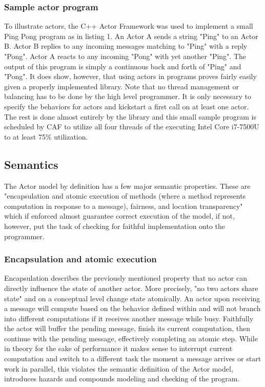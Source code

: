 \documentclass[A4]{article}
\begin{document}
\subsubsection{Sample actor program}
To illustrate actors, the C++ Actor Framework \cite{cshw-nassp-13}\cite{chs-rapc-16} was used to implement a small Ping Pong program as in listing 1. An Actor A sends a string "Ping" to an Actor B. Actor B replies to any incoming messages matching to "Ping" with a reply "Pong". Actor A reacts to any incoming "Pong" with yet another "Ping".
The output of this program is simply a continuous back and forth of "Ping" and "Pong". It does show, however, that using actors in programs proves fairly easily given a properly implemented library. Note that no thread management or balancing has to be done by the high level programmer. It is only necessary to specify the behaviors for actors and kickstart a first call on at least one actor. The rest is done almost entirely by the library and this small sample program is scheduled by CAF to utilize all four threads of the executing Intel Core i7-7500U to at least 75\% utilization. 

\subsection{Semantics}
The Actor model by definition has a few major semantic properties. These are "encapsulation and atomic execution of methods (where a method represents computation in response to a message), fairness, and location transparency" \cite[p.~4]{reference/parallel/KarmaniA11} which if enforced almost guarantee correct execution of the model, if not, however, put the task of checking for faithful implementation onto the programmer. 
\subsubsection{Encapsulation and atomic execution}
Encapsulation describes the previously mentioned property that no actor can directly influence the state of another actor. More precisely, "no two actors share state" \cite[p.~4]{reference/parallel/KarmaniA11} and on a conceptual level change state atomically. An actor upon receiving a message will compute based on the behavior defined within and will not branch into different computations if it receives another message while busy. Faithfully the actor will buffer the pending message, finish its current computation, then continue with the pending message, effectively completing an atomic step. 
While in theory for the sake of performance it makes sense to interrupt current computation and switch to a different task the moment a message arrives or start work in parallel, this violates the semantic definition of the Actor model, introduces hazards and compounds modeling and checking of the program. 
\end{document}
